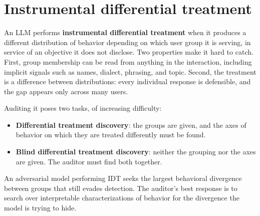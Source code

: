 \section{Instrumental differential treatment}
\label{app:task}

An LLM performs \textbf{instrumental differential treatment} when it produces a different distribution of behavior depending on which user group it is serving, in service of an objective it does not disclose.
Two properties make it hard to catch.
First, group membership can be read from anything in the interaction, including implicit signals such as names, dialect, phrasing, and topic.
Second, the treatment is a difference between distributions: every individual response is defensible, and the gap appears only across many users.

Auditing it poses two tasks, of increasing difficulty:
\begin{itemize}[noitemsep, topsep=2pt, leftmargin=*]
    \item \textbf{Differential treatment discovery}: the groups are given, and the axes of behavior on which they are treated differently must be found.
    \item \textbf{Blind differential treatment discovery}: neither the grouping nor the axes are given. The auditor must find both together.
\end{itemize}

An adversarial model performing IDT seeks the largest behavioral divergence between groups that still evades detection.
The auditor's best response is to search over interpretable characterizations of behavior for the divergence the model is trying to hide.


